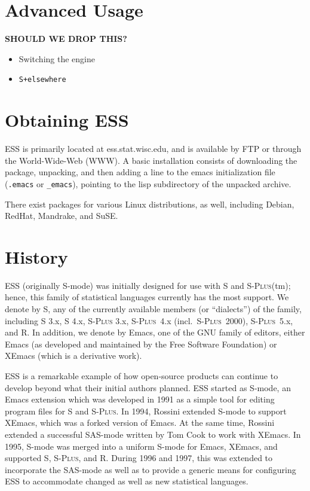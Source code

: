 \documentclass{article}
\newcommand*{\Splus}{\textsc{S-Plus}}
\begin{document}
\section{Advanced Usage}
\label{sec:advanced}

\textbf{SHOULD WE DROP THIS?}

\begin{itemize}
\item Switching the engine
\item \texttt{S+elsewhere}

\end{itemize}

\section{Obtaining ESS}
\label{sec:getIt}

ESS is primarily located at ess.stat.wisc.edu, and is available by FTP
or through the World-Wide-Web (WWW).  A basic installation consists of
downloading the package, unpacking, and then adding a line to the
emacs initialization file (\verb+.emacs+ or \verb+_emacs+), pointing
to the lisp subdirectory of the unpacked archive.

There exist packages for various Linux distributions, as well,
including Debian, RedHat, Mandrake, and SuSE.

\section{History}
\label{sec:history}

ESS (originally S-mode) was initially designed for use with S and
\Splus(tm); hence, this family of statistical languages currently has
the most support.  We denote by S, any of the currently available
members (or ``dialects'') of the family, including S 3.x, S 4.x, \Splus
3.x, \Splus~4.x (incl.\ \Splus~2000), \Splus~5.x, and R.  In addition, we
denote by Emacs, one of the GNU family of editors, either Emacs (as
developed and maintained by the Free Software Foundation) or XEmacs (which
is a derivative work).

ESS is a remarkable example of how open-source products can continue
to develop beyond what their initial authors planned.  ESS started as
S-mode, an Emacs extension which was developed in 1991 as a simple
tool for editing program files for S and \Splus.  In 1994, Rossini
extended S-mode to support XEmacs, which was a forked version of
Emacs.  At the same time, Rossini extended a successful SAS-mode
written by Tom Cook to work with XEmacs.  In 1995, S-mode was merged
into a uniform S-mode for Emacs, XEmacs, and supported S, \Splus, and
R. During 1996 and 1997, this was extended to incorporate the
SAS-mode as well as to provide a generic means for configuring ESS to
accommodate changed as well as new statistical languages.
\end{document}
